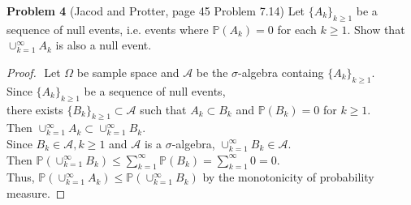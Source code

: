 \documentclass{article}
\newcommand{\bbp}{\mathbb{P}}
\newcommand{\lla}{\mathcal{A}}
\begin{document}
\vspace{3 mm}

\noindent \textbf{Problem 4} (Jacod and Protter, page 45 Problem 7.14) Let $\{A_{k}\}_{k \geq 1}$ be a sequence of null events, i.e. events where $\mathbb{P}(A_{k}) = 0$ for     each $k \geq 1$.  Show that $\cup_{k=1}^{\infty}A_{k}$ is also a null event.

\begin{proof}
 	$ $\newline
	Let $\Omega$ be sample space and $\lla$ be the $\sigma$-algebra containg $\{A_{k}\}_{k \geq 1}$.\\
	Since $\{A_{k}\}_{k \geq 1}$ be a sequence of null events, \\
	there exists $\{B_{k}\}_{k \geq 1} \subset \lla$ such that $A_k \subset B_k$ and $\bbp(B_k) = 0$ for $k \geq 1$.\\
	Then $\cup_{k=1}^{\infty} A_k \subset \cup_{k=1}^{\infty} B_k$.\\
	Since $B_k \in \lla, k\geq 1$ and $\lla$ is a $\sigma$-algebra, $\cup_{k=1}^{\infty} B_k \in \lla$.\\
	Then $\bbp(\cup_{k=1}^{\infty}B_k) \leq \sum_{k=1}^{\infty}\bbp(B_k) = \sum_{k=1}^{\infty}0 = 0 $.\\
	Thus, $\bbp({\cup_{k=1}^{\infty} A_k}) \leq \bbp({\cup_{k=1}^{\infty} B_k})$ by the monotonicity of probability measure.
\end{proof}
\end{document}
